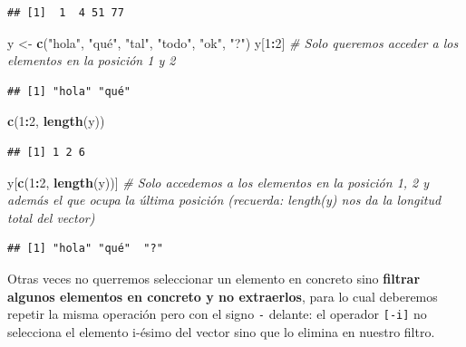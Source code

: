 \documentclass[11pt,]{book}
\newenvironment{Shaded}{\begin{snugshade}}{\end{snugshade}}
\newcommand{\CommentTok}[1]{\textcolor[rgb]{0.37,0.37,0.37}{\textit{#1}}}
\newcommand{\DecValTok}[1]{\textcolor[rgb]{0.06,0.06,0.06}{#1}}
\newcommand{\KeywordTok}[1]{\textcolor[rgb]{0.27,0.27,0.27}{\textbf{#1}}}
\newcommand{\NormalTok}[1]{#1}
\newcommand{\OperatorTok}[1]{\textcolor[rgb]{0.43,0.43,0.43}{\textbf{#1}}}
\newcommand{\StringTok}[1]{\textcolor[rgb]{0.5,0.5,0.5}{#1}}
\begin{document}
\begin{verbatim}
## [1]  1  4 51 77
\end{verbatim}

\begin{Shaded}
\begin{Highlighting}[]
\NormalTok{y <-}\StringTok{ }\KeywordTok{c}\NormalTok{(}\StringTok{"hola"}\NormalTok{, }\StringTok{"qué"}\NormalTok{, }\StringTok{"tal"}\NormalTok{, }\StringTok{"todo"}\NormalTok{, }\StringTok{"ok"}\NormalTok{, }\StringTok{"?"}\NormalTok{)}
\NormalTok{y[}\DecValTok{1}\OperatorTok{:}\DecValTok{2}\NormalTok{] }\CommentTok{# Solo queremos acceder a los elementos en la posición 1 y 2}
\end{Highlighting}
\end{Shaded}

\begin{verbatim}
## [1] "hola" "qué"
\end{verbatim}

\begin{Shaded}
\begin{Highlighting}[]
\KeywordTok{c}\NormalTok{(}\DecValTok{1}\OperatorTok{:}\DecValTok{2}\NormalTok{, }\KeywordTok{length}\NormalTok{(y))}
\end{Highlighting}
\end{Shaded}

\begin{verbatim}
## [1] 1 2 6
\end{verbatim}

\begin{Shaded}
\begin{Highlighting}[]
\NormalTok{y[}\KeywordTok{c}\NormalTok{(}\DecValTok{1}\OperatorTok{:}\DecValTok{2}\NormalTok{, }\KeywordTok{length}\NormalTok{(y))] }\CommentTok{# Solo accedemos a los elementos en la posición 1, 2 y además el que ocupa la última posición (recuerda: length(y) nos da la longitud total del vector)}
\end{Highlighting}
\end{Shaded}

\begin{verbatim}
## [1] "hola" "qué"  "?"
\end{verbatim}

Otras veces no querremos seleccionar un elemento en concreto sino \textbf{filtrar algunos elementos en concreto y no extraerlos}, para lo cual deberemos repetir la misma operación pero con el signo \texttt{-} delante: el operador \texttt{{[}-i{]}} no selecciona el elemento i-ésimo del vector sino que lo elimina en nuestro filtro.
\end{document}
